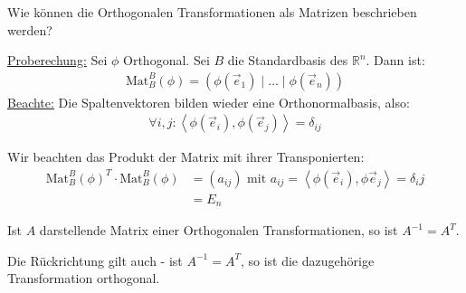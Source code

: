 \documentclass{report}
\newcommand*{\newpar}{\par\vspace{\baselineskip}\noindent}
\newcommand{\ul}[1]{\underline{#1}}
\newcommand{\bR}{\mathbb{R}}
\newcommand{\ve}{\vec{e}}
\newcommand{\Mat}[3]{\text{Mat}^{#1}_{#2}\left(#3\right)}
\newcommand{\scalar}[2]{\left\langle #1, #2 \right\rangle}
\begin{document}
\begin{question}
Wie können die Orthogonalen Transformationen als Matrizen beschrieben werden?
\end{question}
\ul{Proberechung:} Sei $\phi$ Orthogonal. Sei $B$ die Standardbasis des $\bR^n$. Dann ist:
\begin{align*}
 \Mat{B}{B}{\phi} = \left(\phi(\ve_1) \mid \hdots \mid \phi(\ve_n)\right)
\end{align*}
\ul{Beachte:} Die Spaltenvektoren bilden wieder eine Orthonormalbasis, also:
\begin{align*}
 \forall i,j : \scalar{\phi(\ve_i)}{\phi(\ve_j)} = \delta_{ij}
\end{align*}
\newpar
Wir beachten das Produkt der Matrix mit ihrer Transponierten:
\begin{align*}
\Mat{B}{B}{\phi}^T \cdot \Mat{B}{B}{\phi} &= (a_{ij}) \text{ mit } a_{ij} = \scalar{\phi(\ve_i)}{\phi{\ve_j}} = \delta_ij\\
&= E_n
\end{align*}
\begin{theorem}
 Ist $A$ darstellende Matrix einer Orthogonalen Transformationen, so ist $A^{-1} = A^T$.
\end{theorem}
\begin{proposition}
 Die Rückrichtung gilt auch - ist $A^{-1} = A^T$, so ist die dazugehörige Transformation orthogonal.
\end{proposition}
%
%
%
%
%
%
%
%
%
%
%
%
%
%
%
%
%
%
\end{document}
